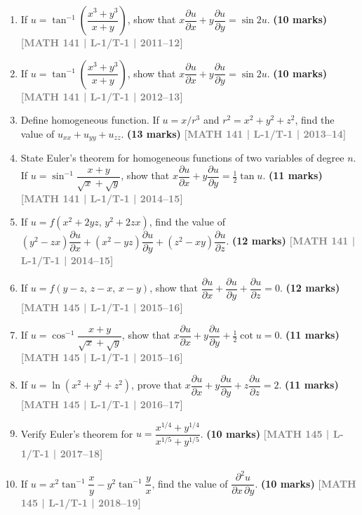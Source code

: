 \documentclass[12pt,a4paper]{article}
\newcommand{\yr}[1]{\hfill\textcolor{gray}{\small\textbf{[#1]}}}
\newcommand{\mk}[1]{\textcolor{orange!70!black}{\small\textbf{(#1 marks)}}}
\begin{document}
\begin{enumerate}
\item If $u=\tan^{-1}\!\left(\dfrac{x^{3}+y^{3}}{x+y}\right)$, show that $x\dfrac{\partial u}{\partial x}+y\dfrac{\partial u}{\partial y}=\sin 2u$.
\mk{10} \yr{MATH 141 | L-1/T-1 | 2011--12}

\item If $u=\tan^{-1}\!\left(\dfrac{x^{3}+y^{3}}{x+y}\right)$, show that $x\dfrac{\partial u}{\partial x}+y\dfrac{\partial u}{\partial y}=\sin 2u$.
\mk{10} \yr{MATH 141 | L-1/T-1 | 2012--13}

\item Define homogeneous function. If $u=x/r^{3}$ and $r^{2}=x^{2}+y^{2}+z^{2}$, find the value of $u_{xx}+u_{yy}+u_{zz}$.
\mk{13} \yr{MATH 141 | L-1/T-1 | 2013--14}

\item State Euler's theorem for homogeneous functions of two variables of degree $n$. If $u=\sin^{-1}\!\dfrac{x+y}{\sqrt{x}+\sqrt{y}}$, show that $x\dfrac{\partial u}{\partial x}+y\dfrac{\partial u}{\partial y}=\tfrac{1}{2}\tan u$.
\mk{11} \yr{MATH 141 | L-1/T-1 | 2014--15}

\item If $u=f(x^{2}+2yz,\,y^{2}+2zx)$, find the value of $(y^{2}-zx)\dfrac{\partial u}{\partial x}+(x^{2}-yz)\dfrac{\partial u}{\partial y}+(z^{2}-xy)\dfrac{\partial u}{\partial z}$.
\mk{12} \yr{MATH 141 | L-1/T-1 | 2014--15}

\item If $u=f(y-z,\,z-x,\,x-y)$, show that $\dfrac{\partial u}{\partial x}+\dfrac{\partial u}{\partial y}+\dfrac{\partial u}{\partial z}=0$.
\mk{12} \yr{MATH 145 | L-1/T-1 | 2015--16}

\item If $u=\cos^{-1}\!\dfrac{x+y}{\sqrt{x}+\sqrt{y}}$, show that $x\dfrac{\partial u}{\partial x}+y\dfrac{\partial u}{\partial y}+\tfrac{1}{2}\cot u=0$.
\mk{11} \yr{MATH 145 | L-1/T-1 | 2015--16}

\item If $u=\ln(x^{2}+y^{2}+z^{2})$, prove that $x\dfrac{\partial u}{\partial x}+y\dfrac{\partial u}{\partial y}+z\dfrac{\partial u}{\partial z}=2$.
\mk{11} \yr{MATH 145 | L-1/T-1 | 2016--17}

\item Verify Euler's theorem for $u=\dfrac{x^{1/4}+y^{1/4}}{x^{1/5}+y^{1/5}}$.
\mk{10} \yr{MATH 145 | L-1/T-1 | 2017--18}

\item If $u=x^{2}\tan^{-1}\!\dfrac{x}{y}-y^{2}\tan^{-1}\!\dfrac{y}{x}$, find the value of $\dfrac{\partial^{2}u}{\partial x\,\partial y}$.
\mk{10} \yr{MATH 145 | L-1/T-1 | 2018--19}


\end{enumerate}
\end{document}
